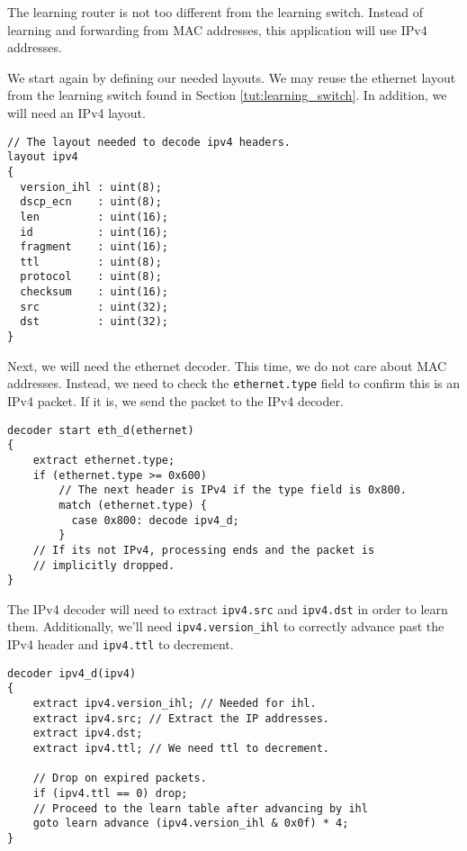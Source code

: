 The learning router is not too different from the learning switch. Instead of learning and forwarding from MAC addresses, this application will use IPv4 addresses.

We start again by defining our needed layouts. We may reuse the ethernet layout from the learning switch found in Section \ref{tut:learning_switch}. In addition, we will need an IPv4 layout.

\begin{codepage}
\begin{lstlisting}
// The layout needed to decode ipv4 headers.
layout ipv4
{
  version_ihl : uint(8);
  dscp_ecn    : uint(8); 
  len         : uint(16);
  id          : uint(16);
  fragment    : uint(16);
  ttl         : uint(8);
  protocol    : uint(8);
  checksum    : uint(16);
  src         : uint(32);
  dst         : uint(32);
}
\end{lstlisting}
\end{codepage}

Next, we will need the ethernet decoder. This time, we do not care about MAC addresses. Instead, we need to check the \texttt{ethernet.type} field to confirm this is an IPv4 packet. If it is, we send the packet to the IPv4 decoder.

\begin{codepage}
\begin{lstlisting}
decoder start eth_d(ethernet)
{
	extract ethernet.type;
	if (ethernet.type >= 0x600)
	  	// The next header is IPv4 if the type field is 0x800.
	    match (ethernet.type) {
	      case 0x800: decode ipv4_d;
	    }
	// If its not IPv4, processing ends and the packet is
	// implicitly dropped.
}
\end{lstlisting}
\end{codepage}

The IPv4 decoder will need to extract \texttt{ipv4.src} and \texttt{ipv4.dst} in order to learn them. Additionally, we'll need \texttt{ipv4.version\_ihl} to correctly advance past the IPv4 header and \texttt{ipv4.ttl} to decrement.

\begin{codepage}
\begin{lstlisting}
decoder ipv4_d(ipv4)
{
	extract ipv4.version_ihl; // Needed for ihl.
	extract ipv4.src; // Extract the IP addresses.
	extract ipv4.dst;
	extract ipv4.ttl; // We need ttl to decrement.
  
	// Drop on expired packets.
	if (ipv4.ttl == 0) drop;
	// Proceed to the learn table after advancing by ihl
	goto learn advance (ipv4.version_ihl & 0x0f) * 4;
}
\end{lstlisting}
\end{codepage}

